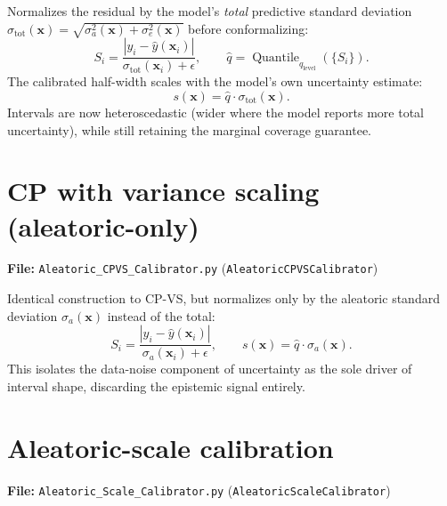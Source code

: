 \documentclass[11pt]{article}
\begin{document}
Normalizes the residual by the model's \emph{total} predictive standard deviation
$\sigma_{\mathrm{tot}}(\bm{x}) = \sqrt{\sigma_a^2(\bm{x}) + \sigma_e^2(\bm{x})}$ before
conformalizing:
\begin{equation}
S_i = \frac{|y_i - \hat{y}(\bm{x}_i)|}{\sigma_{\mathrm{tot}}(\bm{x}_i) + \epsilon}, \qquad \hat{q}
= \operatorname{Quantile}_{q_{\mathrm{level}}}(\{S_i\}).
\end{equation}
The calibrated half-width scales with the model's own uncertainty estimate:
\begin{equation}
s(\bm{x}) = \hat{q}\cdot \sigma_{\mathrm{tot}}(\bm{x}).
\end{equation}
Intervals are now heteroscedastic (wider where the model reports more total uncertainty), while
still retaining the marginal coverage guarantee.

\section{CP with variance scaling (aleatoric-only)}
\textbf{File:} \texttt{Aleatoric\_CPVS\_Calibrator.py} (\texttt{AleatoricCPVSCalibrator})

Identical construction to CP-VS, but normalizes only by the aleatoric standard deviation
$\sigma_a(\bm{x})$ instead of the total:
\begin{equation}
S_i = \frac{|y_i - \hat{y}(\bm{x}_i)|}{\sigma_a(\bm{x}_i) + \epsilon}, \qquad
s(\bm{x}) = \hat{q}\cdot \sigma_a(\bm{x}).
\end{equation}
This isolates the data-noise component of uncertainty as the sole driver of interval shape,
discarding the epistemic signal entirely.

\section{Aleatoric-scale calibration}
\label{sec:aleatoric-scale}
\textbf{File:} \texttt{Aleatoric\_Scale\_Calibrator.py} (\texttt{AleatoricScaleCalibrator})
\end{document}
